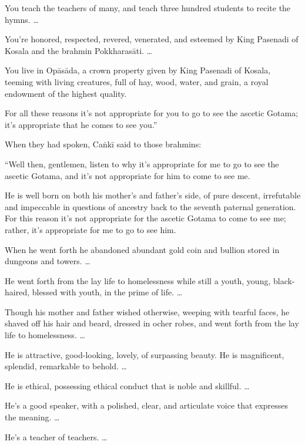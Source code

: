 \documentclass[12pt,openany]{book}%
\begin{document}
You teach the teachers of many, and teach three hundred students to recite the hymns. … 

You’re honored, respected, revered, venerated, and esteemed by King Pasenadi of Kosala and the brahmin \textsanskrit{Pokkharasāti}. … 

You live in \textsanskrit{Opāsāda}, a crown property given by King Pasenadi of Kosala, teeming with living creatures, full of hay, wood, water, and grain, a royal endowment of the highest quality. 

For all these reasons it’s not appropriate for you to go to see the ascetic Gotama; it’s appropriate that he comes to see you.” 

When they had spoken, \textsanskrit{Caṅkī} said to those brahmins: 

“Well then, gentlemen, listen to why it’s appropriate for me to go to see the ascetic Gotama, and it’s not appropriate for him to come to see me. 

He is well born on both his mother’s and father’s side, of pure descent, irrefutable and impeccable in questions of ancestry back to the seventh paternal generation. For this reason it’s not appropriate for the ascetic Gotama to come to see me; rather, it’s appropriate for me to go to see him. 

When he went forth he abandoned abundant gold coin and bullion stored in dungeons and towers. … 

He went forth from the lay life to homelessness while still a youth, young, black-haired, blessed with youth, in the prime of life. … 

Though his mother and father wished otherwise, weeping with tearful faces, he shaved off his hair and beard, dressed in ocher robes, and went forth from the lay life to homelessness. … 

He is attractive, good-looking, lovely, of surpassing beauty. He is magnificent, splendid, remarkable to behold. … 

He is ethical, possessing ethical conduct that is noble and skillful. … 

He’s a good speaker, with a polished, clear, and articulate voice that expresses the meaning. … 

He’s a teacher of teachers. … 
\end{document}
